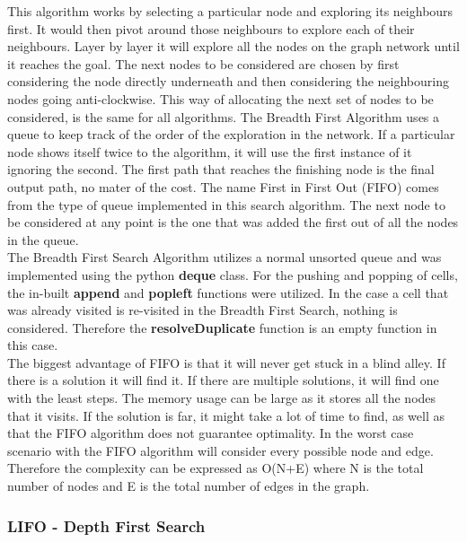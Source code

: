 \documentclass[a4paper,12pt]{article}
\begin{document}
				This algorithm works by selecting a particular node and exploring its neighbours first. It would then pivot around those neighbours to explore each of their neighbours. Layer by layer it will explore all the nodes on the graph network until it reaches the goal. The next nodes to be considered are chosen by first considering the node directly underneath and then considering the neighbouring nodes going anti-clockwise. This way of allocating the next set of nodes to be considered, is the same for all algorithms. The Breadth First Algorithm uses a queue to keep track of the order of the exploration in the network. If a particular node shows itself twice to the algorithm, it will use the first instance of it ignoring the second. The first path that reaches the finishing node is the final output path, no mater of the cost. The name First in First Out (FIFO) comes from the type of queue implemented in this search algorithm. The next node to be considered at any point is the one that was added the first out of all the nodes in the queue.
				\\
				The Breadth First Search Algorithm utilizes a normal unsorted queue and was implemented using the python \textbf{deque} class. For the pushing and popping of cells, the in-built \textbf{append} and \textbf{popleft} functions were utilized. In the case a cell that was already visited is re-visited in the Breadth First Search, nothing is considered. Therefore the \textbf{resolveDuplicate} function is an empty function in this case. 
				\\
				The biggest advantage of FIFO is that it will never get stuck in a blind alley. If there is a solution it will find it. If there are multiple solutions, it will find one with the least steps. The memory usage can be large as it stores all the nodes that it visits. If the solution is far, it might take a lot of time to find, as well as that the FIFO algorithm does not guarantee optimality. In the worst case scenario with the FIFO algorithm will consider every possible node and edge. Therefore the complexity can be expressed as O(N+E) where N is the total number of nodes and E is the total number of edges in the graph. 
			
			\subsubsection{LIFO - Depth First Search}
			
\end{document}
